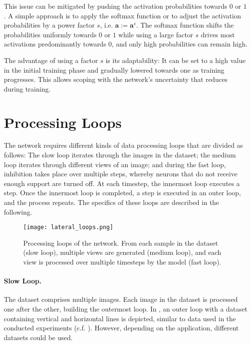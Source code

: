 This issue can be mitigated by pushing the activation probabilities towards $0$ or $1$. A simple approach is to apply the softmax function or to adjust the activation probabilities by a power factor $s$, i.e. $\boldsymbol{a} := \boldsymbol{a}^s$. The softmax function shifts the probabilities uniformly towards $0$ or $1$ while using a large factor $s$ drives most activations predominantly towards $0$, and only high probabilities can remain high.

The advantage of using a factor $s$ is its adaptability: It can be set to a high value in the initial training phase and gradually lowered towards one as training progresses. This allows scoping with the network's uncertainty that reduces during training.


\section{Processing Loops}
The network requires different kinds of data processing loops that are divided as follows:
The slow loop iterates through the images in the dataset; the medium loop iterates through different views of an image; and during the fast loop, inhibition takes place over multiple steps, whereby neurons that do not receive enough support are turned off.
At each timestep, the innermost loop executes a step. Once the innermost loop is completed, a step is executed in an outer loop, and the process repeats. The specifics of these loops are described in the following.

\begin{figure}[h]
    \centering
    \texttt{[image: lateral\_loops.png]}
    \caption[Processing loops of the network]{Processing loops of the network. From each sample in the dataset (slow loop), multiple views are generated (medium loop), and each view is processed over multiple timesteps by the model (fast loop).}
\end{figure}

\paragraph{Slow Loop.} The dataset comprises multiple images. Each image in the dataset is processed one after the other, building the outermost loop. In , an outer loop with a dataset containing vertical and horizontal lines is depicted, similar to data used in the conducted experiments (c.f. ). However, depending on the application, different datasets could be used.


